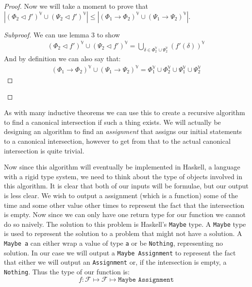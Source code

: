 \documentclass{article}
\newenvironment{subproof}{%
  \begin{proof}[Subproof]%
}{%
  \end{proof}%
}
\begin{document}
\begin{proof}
Now we will take a moment to prove that $|(\Phi_2\lhd f')^\mathbb{V}\cup(\Psi_2\lhd f')^\mathbb{V}| \leq |(\Phi_1\rightarrow\Phi_2)^\mathbb{V} \cup (\Psi_1\rightarrow\Psi_2)^\mathbb{V}|$.
\begin{subproof}
We can use lemma 3 to show
\begin{align*}
(\Phi_2\lhd f')^\mathbb{V}\cup(\Psi_2\lhd f')^\mathbb{V}
= \bigcup_{\delta \in \Phi_2^\mathbb{V}\cup\Psi_2^\mathbb{V}}(f'(\delta))^\mathbb{V}
\end{align*}
And by definition we can also say that:
\begin{align*}
(\Phi_1\rightarrow\Phi_2)^\mathbb{V} \cup (\Psi_1\rightarrow\Psi_2)^\mathbb{V} =
\Phi_1^\mathbb{V}\cup\Phi_2^\mathbb{V} \cup \Psi_1^\mathbb{V}\cup\Psi_2^\mathbb{V}
\end{align*}

\end{subproof}

\end{proof}

As with many inductive theorems we can use this to create a recursive algorithm to find a canonical intersection if such a thing exists.
We will actually be designing an algorithm to find an \textit{assignment} that assigns our initial statements to a canonical intersection,
however to get from that to the actual canonical intersection is quite trivial.

Now since this algorithm will eventually be implemented in Haskell, a language with a rigid type system, we need to think about the type of objects involved in this algorithm.
It is clear that both of our inputs will be formulae, but our output is less clear.
We wish to output a assignment (which is a function) some of the time and some other value other times to represent the fact that the intersection is empty.
Now since we can only have one return type for our function we cannot do so naively.
The solution to this problem is Haskell's \texttt{Maybe} type.
A \texttt{Maybe} type is used to represent the solution to a problem that might not have a solution.
A \texttt{Maybe a} can either wrap a value of type \texttt{a} or be \texttt{Nothing}, representing no solution.
In our case we will output a \texttt{Maybe Assignment} to represent the fact that either we will output an \texttt{Assignment} or, if the intersection is empty, a \texttt{Nothing}.
Thus the type of our function is:
\begin{equation*}
f : \mathcal{F} \mapsto \mathcal{F} \mapsto \texttt{Maybe Assignment}
\end{equation*}
\end{document}
